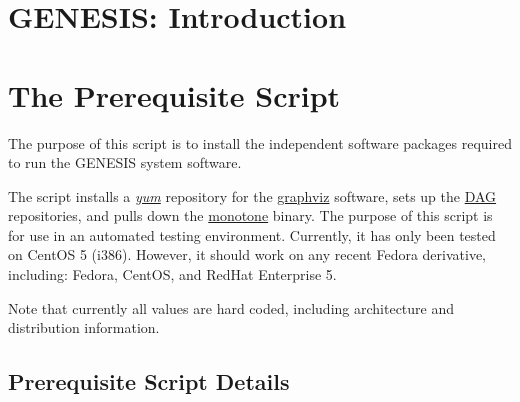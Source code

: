 \documentclass[12pt]{article}
\begin{document}
\section*{GENESIS: Introduction}

\section*{The Prerequisite Script}

The purpose of this script is to install the independent software packages required to run the GENESIS system software.

The script installs a \href{http://www.centos.org/docs/5/html/yum/}{\it yum} repository for the \href{http://www.graphviz.org/}{graphviz} software, sets up the \href{http://dag.wieers.com/rpm/}{DAG} repositories, and pulls down the \href{http://monotone.ca/}{monotone} binary. The purpose of this script is for use in an automated testing environment. Currently, it has only been tested on CentOS 5 (i386). However, it should work on any recent Fedora derivative, including: Fedora, CentOS, and RedHat Enterprise 5.

Note that currently all values are hard coded, including architecture and distribution information.

\subsection*{Prerequisite Script Details}
\end{document}
